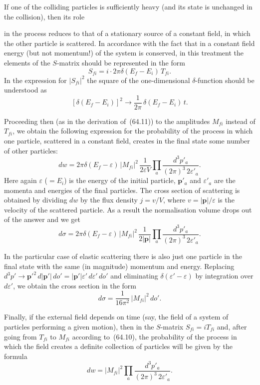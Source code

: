 If one of the colliding particles is sufficiently heavy (and its state is unchanged in the collision), then its role

in the process reduces to that of a stationary source of a constant field, in which the other particle is scattered. In accordance with the fact that in a constant field energy (but not momentum!) of the system is conserved, in this treatment the elements of the $S$-matrix should be represented in the form
\begin{equation}
S_{fi} = i \cdot 2\pi\delta(E_f - E_i)\,T_{fi}.
\tag{64.24}
\end{equation}
In the expression for $|S_{fi}|^2$ the square of the one-dimensional $\delta$-function should be understood as
\[
[\delta(E_f - E_i)]^2 \to \frac{1}{2\pi}\,\delta(E_f - E_i)\,t.
\]

Proceeding then (as in the derivation of~(64.11)) to the amplitudes $M_{fi}$ instead of $T_{fi}$, we obtain the following expression for the probability of the process in which one particle, scattered in a constant field, creates in the final state some number of other particles:
\begin{equation}
dw = 2\pi\delta(E_f - \varepsilon)\,|M_{fi}|^2\,\frac{1}{2\varepsilon V}\prod_a\frac{d^3p'_a}{(2\pi)^3\,2\varepsilon'_a}.
\tag{64.25}
\end{equation}
Here again $\varepsilon$ ($= E_i$) is the energy of the initial particle, $\mathbf{p}'_a$ and $\varepsilon'_a$ are the momenta and energies of the final particles. The cross section of scattering is obtained by dividing $dw$ by the flux density $j = v/V$, where $v = |\mathbf{p}|/\varepsilon$ is the velocity of the scattered particle. As a result the normalisation volume drops out of the answer and we get
\begin{equation}
d\sigma = 2\pi\delta(E_f - \varepsilon)\,|M_{fi}|^2\,\frac{1}{2|\mathbf{p}|}\prod_a\frac{d^3p'_a}{(2\pi)^3\,2\varepsilon'_a}.
\tag{64.25}
\end{equation}

In the particular case of elastic scattering there is also just one particle in the final state with the same (in magnitude) momentum and energy. Replacing $d^3p' \to \mathbf{p}'^2\,d|\mathbf{p}'|\,do' = |\mathbf{p}'|\varepsilon'\,d\varepsilon'\,do'$ and eliminating $\delta(\varepsilon' - \varepsilon)$ by integration over $d\varepsilon'$, we obtain the cross section in the form
\begin{equation}
d\sigma = \frac{1}{16\pi^2}\,|M_{fi}|^2\,do'.
\tag{64.26}
\end{equation}

Finally, if the external field depends on time (say, the field of a system of particles performing a given motion), then in the $S$-matrix $S_{fi} = iT_{fi}$ and, after going from $T_{fi}$ to $M_{fi}$ according to~(64.10), the probability of the process in which the field creates a definite collection of particles will be given by the formula
\begin{equation}
dw = |M_{fi}|^2\prod_a\frac{d^3p'_a}{(2\pi)^3\,2\varepsilon'_a}.
\tag{64.27}
\end{equation}
